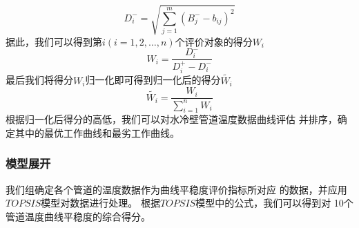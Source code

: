         \begin{equation}
            D_i^- = \sqrt{\sum_{j=1}^{m} (B_j^- - b_{ij})^2}
        \end{equation}
        据此，我们可以得到第$i(i=1,2,…,n)$个评价对象的得分$W_i$
        \begin{equation}
            W_i = \frac{D_i^-}{D_i^+ - D_i^-}
        \end{equation}
        最后我们将得分$W_i$归一化即可得到归一化后的得分$\tilde{W_i}$
        \begin{equation}
            \tilde{W_i} = \frac{W_i}{\sum_{i=1}^{n} W_i}
        \end{equation}
        根据归一化后得分的高低，我们可以对水冷壁管道温度数据曲线评估
        并排序，确定其中的最优工作曲线和最劣工作曲线。

        \subsubsection{模型展开}
            我们组确定各个管道的温度数据作为曲线平稳度评价指标所对应
            的数据，并应用$TOPSIS$模型对数据进行处理。
            根据$TOPSIS$模型中的公式，我们可以得到对
            10个管道温度曲线平稳度的综合得分。
